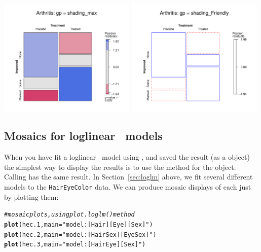 \documentclass[10pt,twoside]{article}\usepackage[]{graphicx}\usepackage[]{color}
\makeatletter
\newcommand{\hlstr}[1]{\textcolor[rgb]{0.192,0.494,0.8}{#1}}%
\newcommand{\hlcom}[1]{\textcolor[rgb]{0.678,0.584,0.686}{\textit{#1}}}%
\newcommand{\hlstd}[1]{\textcolor[rgb]{0.345,0.345,0.345}{#1}}%
\newcommand{\hlkwc}[1]{\textcolor[rgb]{0.333,0.667,0.333}{#1}}%
\newcommand{\hlkwd}[1]{\textcolor[rgb]{0.737,0.353,0.396}{\textbf{#1}}}%
\newenvironment{kframe}{%
 \def\at@end@of@kframe{}%
 \ifinner\ifhmode%
  \def\at@end@of@kframe{\end{minipage}}%
  \begin{minipage}{\columnwidth}%
 \fi\fi%
 \def\FrameCommand##1{\hskip\@totalleftmargin \hskip-\fboxsep
 \colorbox{shadecolor}{##1}\hskip-\fboxsep
     \hskip-\linewidth \hskip-\@totalleftmargin \hskip\columnwidth}%
 \MakeFramed {\advance\hsize-\width
   \@totalleftmargin\z@ \linewidth\hsize
   \@setminipage}}%
 {\par\unskip\endMakeFramed%
 \at@end@of@kframe}
\newenvironment{knitrout}{}{} %
\newcommand{\secref}[1]{Section~\ref{#1}}
\newcommand{\loglin}{loglinear }
\newcommand{\data}[1]{\texttt{#1}}
\newcommand{\codefun}[1]{\code{#1()}}
\makeatother
\begin{document}




\includegraphics[width=0.49\textwidth]{fig/vcd-tut-art21}
\includegraphics[width=0.49\textwidth]{fig/vcd-tut-art22}


\subsection[Mosaics for loglinear models]{Mosaics for \loglin\ models}\label{sec:mosaic-llm}

When you have fit a \loglin\ model using \codefun{loglm}, 
and saved the result (as a  object) the simplest way to display the
results is to use the \codefun{plot} method for the  object.
Calling  has the same result.
In \secref{sec:loglm} above, we fit several different models to the
\data{HairEyeColor} data.  We can produce mosaic displays of each just
by plotting them:

\begin{knitrout}
\color{fgcolor}\begin{kframe}
\begin{alltt}
\hlcom{# mosaic plots, using plot.loglm() method}
\hlkwd{plot}\hlstd{(hec.1,} \hlkwc{main}\hlstd{=}\hlstr{"model: [Hair][Eye][Sex]"}\hlstd{)}
\hlkwd{plot}\hlstd{(hec.2,} \hlkwc{main}\hlstd{=}\hlstr{"model: [HairSex][EyeSex]"}\hlstd{)}
\hlkwd{plot}\hlstd{(hec.3,} \hlkwc{main}\hlstd{=}\hlstr{"model: [HairEye][Sex]"}\hlstd{)}
\end{alltt}
\end{kframe}
\end{knitrout}
\end{document}
